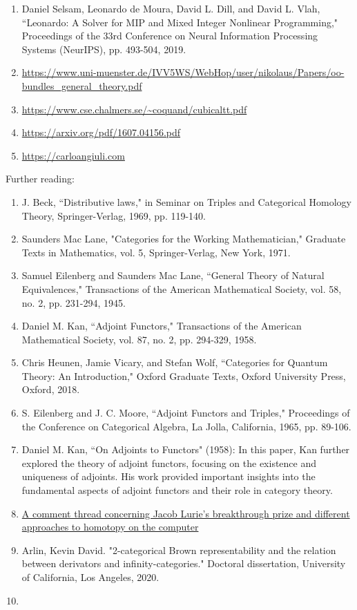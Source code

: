 \documentclass{book}
\theoremstyle{definition}
\begin{document}
\begin{enumerate}
\item Daniel Selsam, Leonardo de Moura, David L. Dill, and David L. Vlah, ``Leonardo: A Solver for MIP and Mixed Integer Nonlinear Programming," Proceedings of the 33rd Conference on Neural Information Processing Systems (NeurIPS), pp. 493-504, 2019.
\item \url{https://www.uni-muenster.de/IVV5WS/WebHop/user/nikolaus/Papers/oo-bundles_general_theory.pdf}
\item \url{https://www.cse.chalmers.se/~coquand/cubicaltt.pdf}
\item \url{https://arxiv.org/pdf/1607.04156.pdf}
\item \url{https://carloangiuli.com}
\end{enumerate}

Further reading:

\begin{enumerate}
\item J. Beck, ``Distributive laws," in Seminar on Triples and Categorical Homology Theory, Springer-Verlag, 1969, pp. 119-140.
\item Saunders Mac Lane, "Categories for the Working Mathematician," Graduate Texts in Mathematics, vol. 5, Springer-Verlag, New York, 1971.
\item Samuel Eilenberg and Saunders Mac Lane, ``General Theory of Natural Equivalences," Transactions of the American Mathematical Society, vol. 58, no. 2, pp. 231-294, 1945.
\item Daniel M. Kan, ``Adjoint Functors," Transactions of the American Mathematical Society, vol. 87, no. 2, pp. 294-329, 1958.
\item Chris Heunen, Jamie Vicary, and Stefan Wolf, ``Categories for Quantum Theory: An Introduction," Oxford Graduate Texts, Oxford University Press, Oxford, 2018.
\item S. Eilenberg and J. C. Moore, ``Adjoint Functors and Triples," Proceedings of the Conference on Categorical Algebra, La Jolla, California, 1965, pp. 89-106.
\item Daniel M. Kan, ``On Adjoints to Functors" (1958): In this paper, Kan further explored the theory of adjoint functors, focusing on the existence and uniqueness of adjoints. His work provided important insights into the fundamental aspects of adjoint functors and their role in category theory.
\item \href{https://mathematicswithoutapologies.wordpress.com/2015/05/13/univalent-foundations-no-comment/}{A comment thread concerning Jacob Lurie's breakthrough prize and different approaches to homotopy on the computer}
\item Arlin, Kevin David. "2-categorical Brown representability and the relation between derivators and infinity-categories." Doctoral dissertation, University of California, Los Angeles, 2020.
\item 
\end{enumerate}
\end{document}
